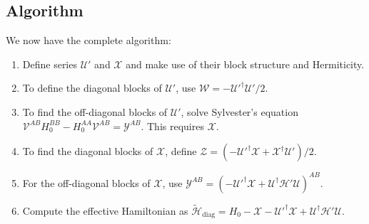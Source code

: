 \subsection{Algorithm}

We now have the complete algorithm:
%
\begin{enumerate}
    \item Define series $\mathcal{U}'$ and $\mathcal{X}$ and make use of their block structure and Hermiticity.
    \item To define the diagonal blocks of $\mathcal{U}'$, use $\mathcal{W} = -\mathcal{U}'^\dagger\mathcal{U}'/2$.
    \item To find the off-diagonal blocks of $\mathcal{U}'$, solve Sylvester's equation $\mathcal{V}^{AB}H_0^{BB} - H_0^{AA}\mathcal{V}^{AB} = \mathcal{Y}^{AB}$.
      This requires $\mathcal{X}$.
    \item To find the diagonal blocks of $\mathcal{X}$, define $\mathcal{Z} = (-\mathcal{U}'^\dagger\mathcal{X} + \mathcal{X}^\dagger\mathcal{U}')/2$.
    \item For the off-diagonal blocks of $\mathcal{X}$, use $\mathcal{Y}^{AB} =
    (-\mathcal{U}'^\dagger\mathcal{X} +
     \mathcal{U}^\dagger\mathcal{H}'\mathcal{U})^{AB}$.
    \item  Compute the effective Hamiltonian as $\tilde{\mathcal{H}}_{\textrm{diag}} = H_0 - \mathcal{X} - \mathcal{U}'^\dagger \mathcal{X} + \mathcal{U}^\dagger\mathcal{H'}\mathcal{U}$.
\end{enumerate}

